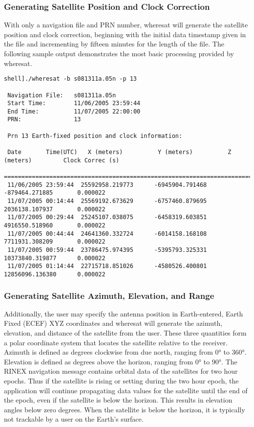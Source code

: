 \subsubsection{Generating Satellite Position and Clock Correction}
With only a navigation file and PRN number, wheresat will generate the satellite position and clock correction, beginning with the initial data timestamp given in the file and incrementing by fifteen minutes for the length of the file.  The following sample output demonstrates the most basic processing provided by wheresat.

\begin{verbatim}
shell]./wheresat -b s081311a.05n -p 13

 Navigation File:   s081311a.05n
 Start Time:        11/06/2005 23:59:44
 End Time:          11/07/2005 22:00:00
 PRN:               13

 Prn 13 Earth-fixed position and clock information:

 Date       Time(UTC)   X (meters)          Y (meters)          Z (meters)         Clock Correc (s)   
 =================================================================================================
 11/06/2005 23:59:44  25592958.219773      -6945904.791468      -879464.271885       0.000022            
 11/07/2005 00:14:44  25569192.673629      -6757460.879695      2036138.107937       0.000022            
 11/07/2005 00:29:44  25245107.038075      -6458319.603851      4916550.518960       0.000022            
 11/07/2005 00:44:44  24641360.332724      -6014158.168108      7711931.308209       0.000022            
 11/07/2005 00:59:44  23786475.974395      -5395793.325331      10373840.319877      0.000022            
 11/07/2005 01:14:44  22715718.851026      -4580526.400801      12856096.136380      0.000022     
\end{verbatim}

\subsubsection{Generating Satellite Azimuth, Elevation, and Range}
Additionally, the user may specify the antenna position in Earth-entered, Earth Fixed (ECEF) XYZ coordinates and wheresat will generate the azimuth, elevation, and distance of the satellite from the user. These three quantities form a polar coordinate system that locates the satellite relative to the receiver. Azimuth is defined as degrees clockwise from due north, ranging from 0° to 360°.  Elevation is defined as degrees above the horizon, ranging from 0° to 90°.  The RINEX navigation message contains orbital data of the satellites for two hour epochs.  Thus if the satellite is rising or setting during the two hour epoch, the application will continue propagating data values for the satellite until the end of the epoch, even if the satellite is below the horizon. This results in elevation angles below zero degrees. When the satellite is below the horizon, it is typically not trackable by a user on the Earth’s surface.

